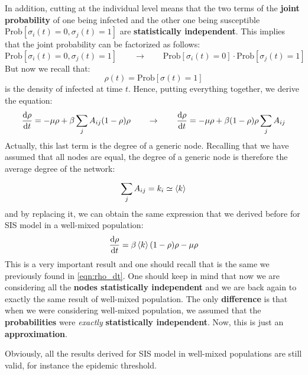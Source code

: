 \documentclass[../main/main.tex]{subfiles}
\begin{document}
In addition, cutting at the individual level means that the two terms of the \textbf{joint probability} of one being infected and the other one being susceptible \( \text{Prob} [\sigma _i (t) = 0, \sigma _j (t ) =1 ] \) are \textbf{statistically independent}. This implies that the joint probability can be factorized as follows:
\begin{equation*}
  \text{Prob} [\sigma _i (t) = 0, \sigma _j (t ) =1 ] \qquad \rightarrow \qquad \text{Prob} [\sigma _i (t) = 0] \cdot \text{Prob} [\sigma _j (t ) =1 ]
\end{equation*}
But now we recall that:
\begin{equation*}
  \rho (t) = \text{Prob} [\sigma (t)=1]
\end{equation*}
is the density of infected at time \( t \).
Hence, putting everything together, we derive the equation:
\begin{equation*}
  \dv{\rho }{t} = - \mu \rho  + \beta \sum_{j}^{} A_{ij} (1- \rho ) \rho \qquad \rightarrow \qquad
   \dv{\rho }{t} = - \mu \rho  + \beta (1- \rho ) \rho \sum_{j}^{} A_{ij}
\end{equation*}
Actually, this last term is the degree of a generic node. Recalling that we have assumed that all nodes are equal, the degree of a generic node is therefore the average degree of the network:
\begin{equation}
  \sum_{j}^{} A_{ij} = k_i \simeq \expval{k}
\end{equation}
and by replacing it, we can obtain the same expression that we derived before for SIS model in a well-mixed population:
\begin{equation}
  \dv{\rho }{t} = \beta \expval{k} (1- \rho ) \rho - \mu \rho
\end{equation}
This is a very important result and one should recall that is the same we previously found in \ref{eqn:rho_dt}.
One should keep in mind that now we are considering all the \textbf{nodes statistically independent} and we are back again to exactly the same result of well-mixed population. The only \textbf{difference} is that when we were considering well-mixed population, we assumed that the \textbf{probabilities} were \emph{exactly} \textbf{statistically independent}. Now, this is just an \textbf{approximation}.

Obviously, all the results derived for SIS model in well-mixed populations are still valid, for instance the epidemic threshold.
\end{document}
